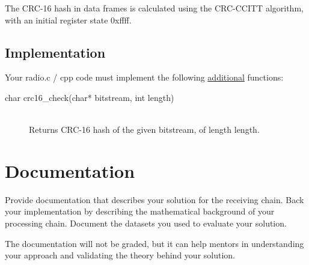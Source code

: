 \documentclass[a4paper]{article}
\begin{document}
The CRC-16 hash in data frames is calculated using the CRC-CCITT algorithm, with an initial register state \textsf{0xffff}.

\subsection*{Implementation}
Your \textsf{radio.c / cpp} code must implement the following \underline{additional} functions:
\begin{description}
	\item[char crc16\_check(char* bitstream, int length)]
	\,\\ Returns CRC-16 hash of the given \textsf{bitstream}, of length \textsf{length}.
\end{description}

\section*{Documentation}

Provide documentation that describes your solution for the receiving chain. Back your implementation by describing the mathematical background of your processing chain. Document the datasets you used to evaluate your solution.

The documentation will not be graded, but it can help mentors in understanding your approach and validating the theory behind your solution.
\end{document}
